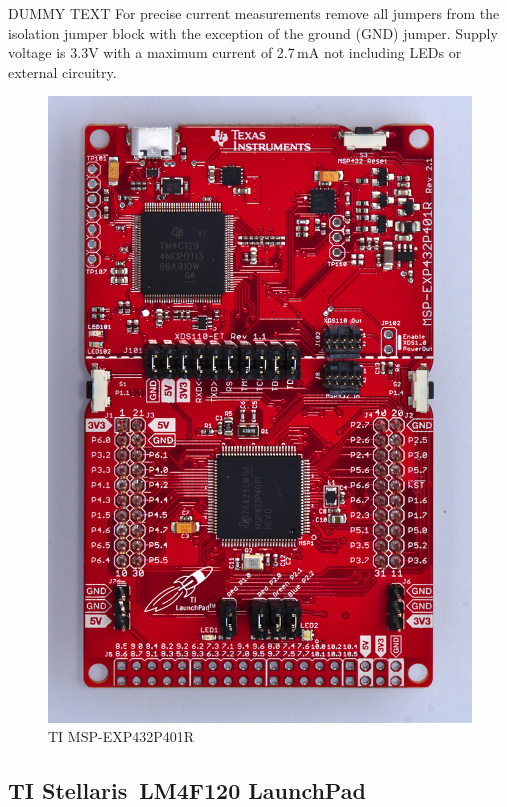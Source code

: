 \documentclass[twoside,11pt]{cergdoc}
\begin{document}
DUMMY TEXT For precise current measurements remove all jumpers from the isolation jumper block 
with the exception of the ground (GND) jumper. Supply voltage is 3.3V with a maximum 
current of 2.7\,mA not including LEDs or external circuitry.

\begin{figure}[ht]
  \begin{center}
    \includegraphics[scale=0.6]{figures/msp-exp432p401r}
    \caption{TI MSP-EXP432P401R}\label{fig:401}
  \end{center}
\vspace{-1ex}
\end{figure}


\subsection{TI Stellaris\textregistered~LM4F120 LaunchPad}
\end{document}
